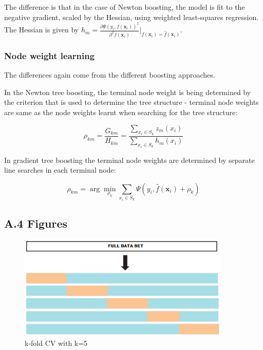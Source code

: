\documentclass[12pt,]{article}
\begin{document}
The difference is that in the case of Newton boosting, the model is fit
to the negative gradient, scaled by the Hessian, using weighted
least-squares regression. The Hessian is given by
\(h_m = \frac{\partial{\Psi(y_{i},f(\mathbf{x}_i))}^{2}}{\partial^{2}{f(\mathbf{x}_i)}}\rvert_{f(\mathbf{x}_i)=\widehat{f}(\mathbf{x}_i)}\).

\hypertarget{node-weight-learning}{%
\subsubsection{Node weight learning}\label{node-weight-learning}}

The differences again come from the different boosting approaches.

In the Newton tree boosting, the terminal node weight is being
determined by the criterion that is used to determine the tree structure
- terminal node weights are same as the node weights learnt when
searching for the tree structure:

\[\rho_{km}=\frac{G_{km}}{H_{km}}=\frac{\sum_{x_i\in S_k}z_m(x_i)}{\sum_{x_i\in S_k}h_m(x_i)}\]

In gradient tree boosting the terminal node weights are determined by
separate line searches in each terminal node:

\[\rho_{km} = \arg\min_{\rho_k}\sum_{x_i\in S_k}\Psi(y_i,\widehat{f}(\mathbf{x}_{i})+\rho_k)\]

\clearpage

\hypertarget{a.4-figures}{%
\subsection{A.4 Figures}\label{a.4-figures}}

\begin{figure}
\centering
\includegraphics[width=0.9\textwidth,height=\textheight]{figures/crossval.png}
\caption{k-fold CV with k=5}
\end{figure}
\end{document}
